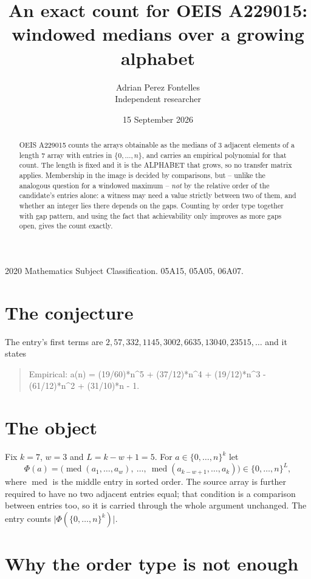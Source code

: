 \documentclass[11pt,a4paper]{article}
\title{An exact count for OEIS A229015: windowed medians over a growing alphabet}
\author{Adrian Perez Fontelles\\ \small Independent researcher}
\date{15 September 2026}
\theoremstyle{plain}
\theoremstyle{definition}
\begin{document}
\maketitle

\begin{abstract}
OEIS A229015 counts the arrays obtainable as the medians of $3$ adjacent elements of a length
$7$ array with entries in $\{0,\dots,n\}$, and carries an empirical polynomial for that
count. The length is fixed and it is the ALPHABET that grows, so no transfer matrix applies.
Membership in the image is decided by comparisons, but -- unlike the analogous question for a
windowed maximum -- \emph{not} by the relative order of the candidate's entries alone: a
witness may need a value strictly between two of them, and whether an integer lies there depends
on the gaps. Counting by order type together with gap pattern, and using the fact that
achievability only improves as more gaps open, gives the count exactly.
\end{abstract}

\noindent\small 2020 Mathematics Subject Classification. 05A15, 05A05, 06A07.\normalsize

\section{The conjecture}

The entry's first terms are $2, 57, 332, 1145, 3002, 6635, 13040, 23515,\dots$ and it states

\begin{quote}\raggedright Empirical: a(n) = (19/60)*n\^{}5 + (37/12)*n\^{}4 + (19/12)*n\^{}3 - (61/12)*n\^{}2 + (31/10)*n - 1.\end{quote}

\section{The object}

Fix $k=7$, $w=3$ and $L=k-w+1=5$. For $a\in\{0,\dots,n\}^k$ let
\[
  \Phi(a)=\bigl(\operatorname{med}(a_1,\dots,a_w),\ \dots,\
  \operatorname{med}(a_{k-w+1},\dots,a_k)\bigr)\in\{0,\dots,n\}^{L} ,
\]
where $\operatorname{med}$ is the middle entry in sorted order. The source array is further required to have no two adjacent entries equal; that condition is a comparison between entries too, so it is carried through the whole argument unchanged. The entry counts
$\lvert\Phi(\{0,\dots,n\}^k)\rvert$.

\section{Why the order type is not enough}
\end{document}
